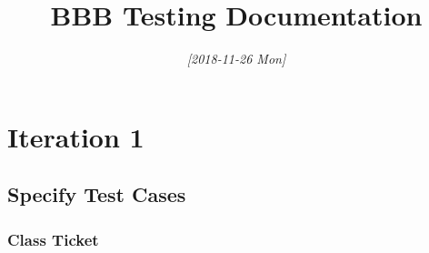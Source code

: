 \documentclass[11pt]{article}
\date{\textit{[2018-11-26 Mon]}}
\title{BBB Testing Documentation}
\begin{document}
\maketitle
\tableofcontents


\section{Iteration 1}
\label{sec:orga319995}

\subsection{Specify Test Cases}
\label{sec:org9433063}

\subsubsection{Class Ticket}
\label{sec:orgd6ffa7f}
\end{document}
